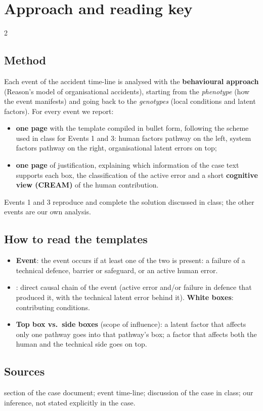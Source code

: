 \section{Approach and reading key}
\begin{multicols}{2}
\subsection{Method}
Each event of the accident time-line is analysed with the \textbf{behavioural approach} (Reason's model of organisational accidents), starting from the \emph{phenotype} (how the event manifests) and going back to the \emph{genotypes} (local conditions and latent factors). For every event we report:
\begin{itemize}
  \item \textbf{one page} with the template compiled in bullet form, following the scheme used in class for Events 1 and 3: human factors pathway on the left, system factors pathway on the right, organisational latent errors on top;
  \item \textbf{one page} of justification, explaining which information of the case text supports each box, the classification of the active error and a short \textbf{cognitive view (CREAM)} of the human contribution.
\end{itemize}
Events 1 and 3 reproduce and complete the solution discussed in class; the other events are our own analysis.

\subsection{How to read the templates}
\begin{itemize}
  \item \textbf{Event}: the event occurs if at least one of the two is present: a failure of a technical defence, barrier or safeguard, or an active human error.
  \item {}: direct causal chain of the event (active error and/or failure in defence that produced it, with the technical latent error behind it). \textbf{White boxes}: contributing conditions.
  \item \textbf{Top box vs.\ side boxes} (scope of influence): a latent factor that affects only one pathway goes into that pathway's box; a factor that affects both the human and the technical side goes on top.
\end{itemize}

\subsection{Sources}
 section of the case document;  event time-line;  discussion of the case in class;  our inference, not stated explicitly in the case.


\end{multicols}
